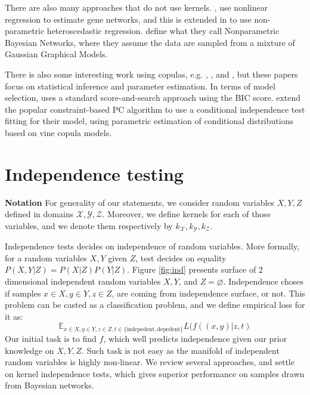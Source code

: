 \documentclass{article} %
\begin{document}
There are also many approaches that do not use kernels.  \cite{imoto2001estimation}, use nonlinear regression to estimate gene networks, and this is extended in \cite{imoto2003bayesian} to use non-parametric heteroscedastic regression.  \cite{ickstadt2010nonparametric} define what they call Nonparametric Bayesian Networks, where they assume the data are sampled from a mixture of Gaussian Graphical Models.

There is also some interesting work using copulas, e.g. \cite{hanea2006hybrid}, \cite{hanea2008mixed}, and \cite{hanea2010mining}, but these papers focus on statistical inference and parameter estimation.  In terms of model selection, \cite{elidan2010copula} uses a standard score-and-search approach using the BIC score.  \cite{bauer2012pair} extend the popular constraint-based PC algorithm to use a conditional independence test fitting for their model, using parametric estimation of conditional distributions based on vine copula models.

\section{Independence testing} 
{\bf Notation} 
For generality of our statements, we consider random variables $X, Y, Z$ defined in domains $\mathcal{X}, \mathcal{Y}, \mathcal{Z}$. Moreover,
we define kernels for each of those variables, and we denote them respectively by $k_{\mathcal{X}}, k_{\mathcal{Y}}, k_{\mathcal{Z}}$.


Independence tests decides on independence of random variables. More formally,
for a random variables $X, Y$ given $Z$, test decides on equality $P(X, Y| Z) = P(X | Z) P(Y | Z)$. 
Figure \ref{fig:ind} presents surface of $2$ dimensional independent 
random variables $X, Y$, and $Z = \varnothing$. Independence choses if samples $x \in X, y \in Y, z \in Z$, 
are coming from independence surface, or not. 
This problem can be casted as a classification problem, and we define
empirical loss for it as:
\begin{equation}
  \mathbb{E}_{x \in X, y \in Y, z \in Z, t \in \{\text{indepedent}, \text{depedent}\}} L(f((x, y)|z, t)
\end{equation}
Our initial task is to find $f$, which well predicts independence given our prior
knowledge on $X, Y, Z$. Such task is not easy as the manifold of independent
random variables is highly non-linear. We review several approaches, and 
settle on kernel independence tests, which gives superior performance on
samples drawn from Bayesian networks.
\end{document}

